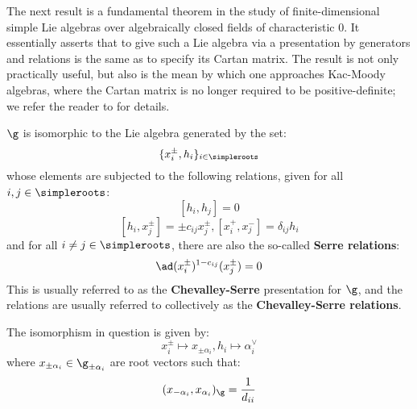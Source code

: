         The next result is a fundamental theorem in the study of finite-dimensional simple Lie algebras over algebraically closed fields of characteristic $0$. It essentially asserts that to give such a Lie algebra via a presentation by generators and relations is the same as to specify its Cartan matrix. The result is not only practically useful, but also is the mean by which one approaches Kac-Moody algebras, where the Cartan matrix is no longer required to be positive-definite; we refer the reader to \cite[Chapters 1-8]{kac_infinite_dimensional_lie_algebras} for details. 
        \begin{theorem} \label{theorem: serre_theorem_for_finite_dimensional_simple_lie_algebras}
            $\g$ is isomorphic to the Lie algebra generated by the set:
                $$\{x_i^{\pm}, h_i\}_{i \in \simpleroots}$$
            whose elements are subjected to the following relations, given for all $i, j \in \simpleroots$:
                $$[h_i, h_j] = 0$$
                $$[h_i, x_j^{\pm}] = \pm c_{ij} x_j^{\pm}, [x_i^+, x_j^-] = \delta_{ij} h_i$$
            and for all $i \not = j \in \simpleroots$, there are also the so-called \textbf{Serre relations}:
                $$\ad(x_i^{\pm})^{1 - c_{ij}}(x_j^{\pm}) = 0$$
            This is usually referred to as the \textbf{Chevalley-Serre} presentation for $\g$, and the relations are usually referred to collectively as the \textbf{Chevalley-Serre relations}.

            The isomorphism in question is given by:
                $$x_i^{\pm} \mapsto x_{\pm \alpha_i}, h_i \mapsto \alpha_i^{\vee}$$
            where $x_{\pm \alpha_i} \in \g_{\pm \alpha_i}$ are root vectors such that:
                $$(x_{-\alpha_i}, x_{\alpha_i})_{\g} = \frac{1}{d_{ii}}$$
        \end{theorem}

